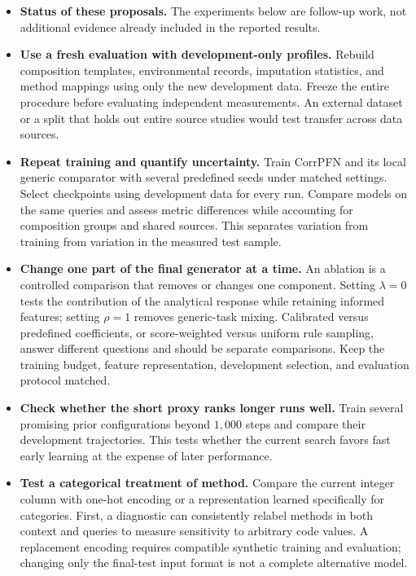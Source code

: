 \documentclass[11pt]{article}
\newenvironment{notes}
  {\begin{itemize}\setlength{\itemsep}{0.45em}\setlength{\parsep}{0pt}}
  {\end{itemize}}
\begin{document}
\begin{notes}
    \item \textbf{Status of these proposals.}
    The experiments below are follow-up work, not additional
    evidence already included in the reported results.

    \item \textbf{Use a fresh evaluation with development-only profiles.}
    Rebuild composition templates, environmental records,
    imputation statistics, and method mappings using only
    the new development data. Freeze the entire procedure
    before evaluating independent measurements.
    An external dataset or a split that holds out entire
    source studies would test transfer across data sources.

    \item \textbf{Repeat training and quantify uncertainty.}
    Train CorrPFN and its local generic comparator with
    several predefined seeds under matched settings.
    Select checkpoints using development data for every run.
    Compare models on the same queries and assess metric
    differences while accounting for composition groups
    and shared sources.
    This separates variation from training from variation
    in the measured test sample.

    \item \textbf{Change one part of the final generator at a time.}
    An ablation is a controlled comparison that removes or
    changes one component.
    Setting \(\lambda=0\) tests the contribution of the
    analytical response while retaining informed features;
    setting \(\rho=1\) removes generic-task mixing.
    Calibrated versus predefined coefficients, or
    score-weighted versus uniform rule sampling, answer
    different questions and should be separate comparisons.
    Keep the training budget, feature representation,
    development selection, and evaluation protocol matched.

    \item \textbf{Check whether the short proxy ranks longer runs well.}
    Train several promising prior configurations beyond
    \(1{,}000\) steps and compare their development trajectories.
    This tests whether the current search favors fast early
    learning at the expense of later performance.

    \item \textbf{Test a categorical treatment of method.}
    Compare the current integer column with one-hot encoding
    or a representation learned specifically for categories.
    First, a diagnostic can consistently relabel methods in
    both context and queries to measure sensitivity to
    arbitrary code values.
    A replacement encoding requires compatible synthetic
    training and evaluation; changing only the final-test
    input format is not a complete alternative model.


\end{notes}
\end{document}
